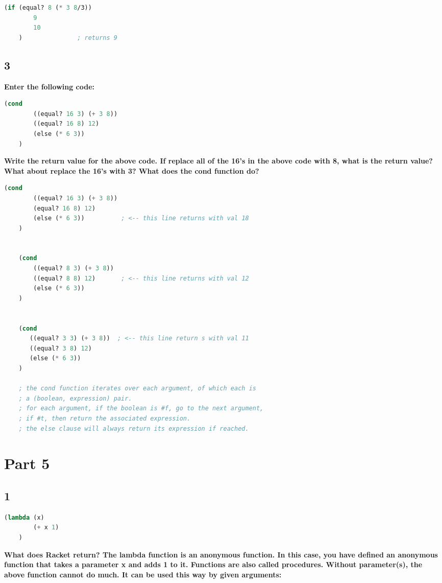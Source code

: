 \documentclass{article}
\begin{document}
\begin{lstlisting}[language=lisp,style=redStyle]
    (if (equal? 8 (* 3 8/3))
        9
        10
    )               ; returns 9
\end{lstlisting}

\subsection*{3}
\begin{adjustwidth}{2em}{0em}
    \textbf{Enter the following code: }
\end{adjustwidth}
\begin{lstlisting}[language=lisp]
    (cond 
        ((equal? 16 3) (+ 3 8)) 
        ((equal? 16 8) 12) 
        (else (* 6 3))
    ) 
\end{lstlisting}
\begin{adjustwidth}{2em}{0em}
    \textbf{Write the return value for the above code. If replace all of the 16's in the above code with 8, what is the return value? What about replace the 16’s with 3? What does the cond function do? }
\end{adjustwidth}

\begin{lstlisting}[language=lisp,style=redStyle]
    (cond 
        ((equal? 16 3) (+ 3 8)) 
        (equal? 16 8) 12) 
        (else (* 6 3))          ; <-- this line returns with val 18
    ) 


    (cond 
        ((equal? 8 3) (+ 3 8)) 
        ((equal? 8 8) 12)       ; <-- this line returns with val 12
        (else (* 6 3))
    ) 


    (cond 
       ((equal? 3 3) (+ 3 8))  ; <-- this line return s with val 11
       ((equal? 3 8) 12) 
       (else (* 6 3))
    ) 

    ; the cond function iterates over each argument, of which each is 
    ; a (boolean, expression) pair.
    ; for each argument, if the boolean is #f, go to the next argument, 
    ; if #t, then return the associated expression.
    ; the else clause will always return its expression if reached.
\end{lstlisting}

\section*{Part 5}
\subsection*{1}
\begin{lstlisting}[language=lisp]
    (lambda (x) 
        (+ x 1)
    ) 
\end{lstlisting}
\begin{adjustwidth}{2em}{0em}
    \textbf{What does Racket return? The lambda function is an anonymous function. In this case, you have defined an anonymous function that takes a parameter x and adds 1 to it. Functions are also called procedures. Without parameter(s), the above function cannot do much. It can be used this way by given arguments: }
\end{adjustwidth}
\end{document}
